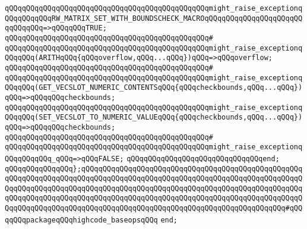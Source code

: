 \verb|qQQqqQQqqQQqqQQqqQQqqQQqqQQqqQQqqQQqqQQqqQQqqQQqmight_raise_exceptionqQQqqQQqqQQqRW_MATRIX_SET_WITH_BOUNDSCHECK_MACROqQQqqQQqqQQqqQQqqQQqqQQqqQQqqQQq=>qQQqqQQqTRUE;|\newline
\verb|qQQqqQQqqQQqqQQqqQQqqQQqqQQqqQQqqQQqqQQqqQQqqQQq#|\newline
\verb|qQQqqQQqqQQqqQQqqQQqqQQqqQQqqQQqqQQqqQQqqQQqqQQqmight_raise_exceptionqQQqqQQq(ARITHqQQq{qQQqoverflow,qQQq...qQQq})qQQq=>qQQqoverflow;|\newline
\verb|qQQqqQQqqQQqqQQqqQQqqQQqqQQqqQQqqQQqqQQqqQQqqQQq#|\newline
\verb|qQQqqQQqqQQqqQQqqQQqqQQqqQQqqQQqqQQqqQQqqQQqqQQqmight_raise_exceptionqQQqqQQq(GET_VECSLOT_NUMERIC_CONTENTSqQQq{qQQqcheckbounds,qQQq...qQQq})qQQq=>qQQqqQQqcheckbounds;|\newline
\verb|qQQqqQQqqQQqqQQqqQQqqQQqqQQqqQQqqQQqqQQqqQQqqQQqmight_raise_exceptionqQQqqQQq(SET_VECSLOT_TO_NUMERIC_VALUEqQQq{qQQqcheckbounds,qQQq...qQQq})qQQq=>qQQqqQQqcheckbounds;|\newline
\verb|qQQqqQQqqQQqqQQqqQQqqQQqqQQqqQQqqQQqqQQqqQQqqQQq#|\newline
\verb|qQQqqQQqqQQqqQQqqQQqqQQqqQQqqQQqqQQqqQQqqQQqqQQqmight_raise_exceptionqQQqqQQqqQQq_qQQq=>qQQqFALSE;|\newline
\verb|qQQqqQQqqQQqqQQqqQQqqQQqqQQqqQQqend;|\newline
\newline
\verb|qQQqqQQqqQQqqQQq};qQQqqQQqqQQqqQQqqQQqqQQqqQQqqQQqqQQqqQQqqQQqqQQqqQQqqQQqqQQqqQQqqQQqqQQqqQQqqQQqqQQqqQQqqQQqqQQqqQQqqQQqqQQqqQQqqQQqqQQqqQQqqQQqqQQqqQQqqQQqqQQqqQQqqQQqqQQqqQQqqQQqqQQqqQQqqQQqqQQqqQQqqQQqqQQqqQQqqQQqqQQqqQQqqQQqqQQqqQQqqQQqqQQqqQQqqQQqqQQqqQQqqQQqqQQqqQQqqQQqqQQqqQQqqQQqqQQqqQQqqQQqqQQqqQQqqQQqqQQqqQQqqQQqqQQqqQQqqQQqqQQqqQQq#qQQqqQQqpackageqQQqhighcode_baseopsqQQq|\newline
\verb|end;|\newline
\newline

